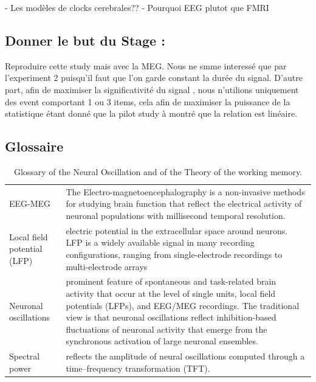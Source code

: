 - Les modèles de clocks cerebrales??
- Pourquoi EEG plutot que FMRI

\subsection{Donner le but du Stage :}

Reproduire cette study mais avec la MEG. Nous ne smme interessé que par l'experiment 2 puisqu'il faut que l'on garde constant la durée du signal.
D'autre part, afin de maximiser la significativité du signal , nous n'utilions uniquement des event  comportant 1 ou 3 items, cela afin de maximiser la puissance de la statistique étant donné que la pilot study à montré que la relation est linéaire.

\subsection{Glossaire}

\begin{table}[ht]
    \caption{Glossary of the Neural Oscillation and of the Theory of the working memory. \cite{roux2014working}}
    \centering
    \begin{tabular}{@{}| p{4cm}|p{9cm}| @{}}
        \hline
        EEG-MEG                     & The Electro-magnetoencephalography is a non-invasive methods for studying brain function that reflect the electrical activity of neuronal populations with millisecond temporal resolution.                                                                                                                                                             \\

        Local field potential (LFP) & electric potential in the extracellular space around neurons. LFP is a widely available signal in many recording configurations, ranging from single-electrode recordings to multi-electrode arrays                                                                                                                                                     \\
        Neuronal oscillations       & prominent feature of spontaneous and task-related brain activity that occur at the level of single units, local field potentials (LFPs), and EEG/MEG recordings. The traditional view is that neuronal oscillations reflect inhibition-based fluctuations of neuronal activity that emerge from the synchronous activation of large neuronal ensembles. \\
        Spectral power              & reflects the amplitude of neural oscillations computed through a time–frequency transformation (TFT).                                                                                                                                                                                                                                                   \\
        \hline
    \end{tabular}
    \label{Tab:Glossary_theory}
\end{table}

